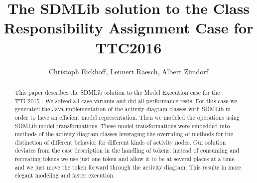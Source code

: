\documentclass[submission,copyright,creativecommons]{eptcs}
\begin{document}





\pagestyle{headings}

\title{The SDMLib solution to the Class Responsibility Assignment Case for TTC2016} 
\author{Christoph Eickhoff, Lennert Raesch, Albert Z{\"u}ndorf
}

\def\authorrunning{ Albert Z{\"u}ndorf}
\def\titlerunning{The SDMLib solution for TTC2016}

\maketitle

\begin{abstract}

This paper describes the SDMLib solution to the Model Execution case for the TTC2015 
\cite{ttc2015-model_execution}. We solved all case variants and did all performance tests. 
For this case we generated the Java implementation of the activity diagram classes
with SDMLib in order to have an efficient model representation. Then we modeled the operations 
using SDMLib model transformations. These model transformations were embedded into methods of
the activity diagram classes leveraging the overriding of methods for the distinction of 
different behavior for different kinds of activity nodes. Our solution deviates from the 
case description in the handling of tokens: instead of consuming and recreating tokens we use
just one token and allow it to be at several places at a time and we just move the token forward 
through the activity diagram. This results in more elegant modeling and faster execution. 
  
\end{abstract}
\end{document}
